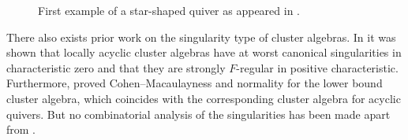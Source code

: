 \documentclass[letter,11pt]{amsart}
\theoremstyle{theorem}
\theoremstyle{definition}
\numberwithin{equation}{section}
\begin{document}
\begin{figure}[h!] 
	\caption{First example of a star-shaped quiver as appeared in \cite{BFMS23}.}
	\label{Fig:Ex_star_quiver_BFMS23}
\end{figure}

There also exists prior work on the singularity type of cluster algebras. 
In \cite{BMRS2015} it was shown that 
locally acyclic cluster algebras have at worst canonical singularities in characteristic zero and that they are
strongly $ F $-regular in positive characteristic.
Furthermore, \cite{MRZ2018} proved Cohen--Macaulayness and normality for the lower bound cluster algebra, which coincides with the corresponding cluster algebra for acyclic quivers. 
But no combinatorial analysis of the singularities has been made apart from \cite{BFMS23}.
\end{document}
